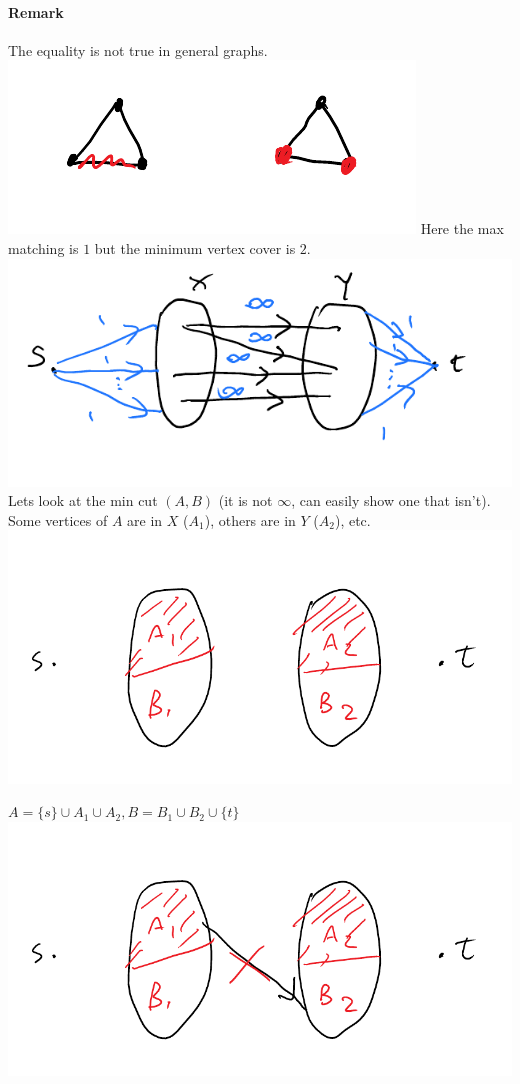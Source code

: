 \documentclass[12 pt]{article}
\begin{document}
        \paragraph{Remark} The equality is not true in general graphs.
        \\ \includegraphics[width=.6\textwidth]{i56.pdf}
        Here the max matching is $1$ but the minimum vertex cover is
        $2$.
        \\ \includegraphics[width=.9\textwidth]{i57.pdf}
        Lets look at the min cut $(A,B)$ (it is not $\infty$, can
        easily show one that isn't). Some vertices of $A$ are in $X$
        ($A_1$), others are in $Y$ ($A_2$), etc.
        \\ \includegraphics[width=.9\textwidth]{i58.pdf}

        $A=\{s\}\cup A_1 \cup A_2, B=B_1 \cup B_2 \cup \{t\}$
        \\ \includegraphics[width=.9\textwidth]{i59.pdf}
\end{document}

